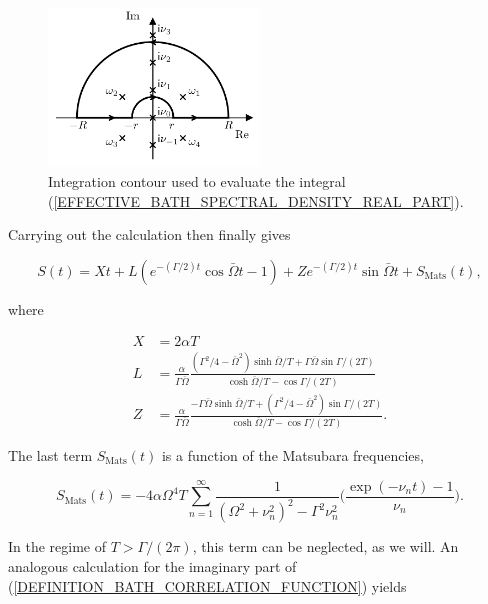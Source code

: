 \documentclass[preprint]{revtex4-2}
\begin{document}
\begin{figure}[H]
    \centering
    \includegraphics[width=0.5\textwidth]{images/BATH_CORRELATION_FUNCTION_INTEGRATION_CONTOUR.png}
    \caption{Integration contour used to evaluate the integral (\ref{EFFECTIVE_BATH_SPECTRAL_DENSITY_REAL_PART}).}
    \label{BATH_CORRELATION_FUNCTION_INTEGRATION_CONTOUR}
\end{figure}

Carrying out the calculation then finally gives 

\begin{equation}
    S(t)=Xt+L(e^{-(\Gamma/2)t}\cos\bar{\Omega}t-1)+Ze^{-(\Gamma/2)t}\sin\bar{\Omega}t+S_{\text{Mats}}(t),
\end{equation}

where 

\begin{align}
    X &= 2\alpha T \\
    L &= \frac{\alpha}{\Gamma\bar{\Omega}}\frac{(\Gamma^2/4-\bar{\Omega}^2)\sinh\bar{\Omega}/T
            +\Gamma\bar{\Omega}\sin\Gamma/(2T)}{\cosh\bar{\Omega}/T-\cos\Gamma/(2T)} \\
    Z &= \frac{\alpha}{\Gamma\bar{\Omega}}\frac{-\Gamma\bar{\Omega}\sinh\bar{\Omega}/T
    +(\Gamma^2/4-\bar{\Omega}^2)\sin\Gamma/(2T)}{\cosh\bar{\Omega}/T-\cos\Gamma/(2T)}.
\end{align}

The last term $S_{\text{Mats}}(t)$ is a function of the Matsubara frequencies, 

\begin{equation}
    S_{\text{Mats}}(t)=-4\alpha\Omega^4T\sum_{n=1}^{\infty}
    \frac{1}{(\Omega^2+\nu_n^2)^2-\Gamma^2\nu_n^2} \Big( \frac{\exp(-\nu_n t)-1}{\nu_n} \Big).
\end{equation}

In the regime of $T>\Gamma/(2\pi)$, this term can be neglected, as we will.
An analogous calculation for the imaginary part of (\ref{DEFINITION_BATH_CORRELATION_FUNCTION}) yields 
\end{document}

